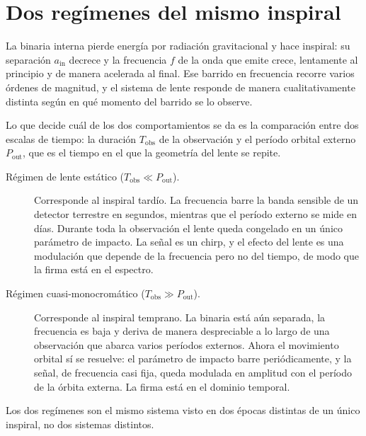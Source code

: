 \documentclass[11pt,a4paper,openany]{book}
\newcommand{\ain}{a_{\mathrm{in}}}
\begin{document}
\section{Dos reg\'imenes del mismo inspiral}
\label{sec:regimenes}

La binaria interna pierde energ\'ia por radiaci\'on gravitacional y hace
inspiral: su separaci\'on $\ain$ decrece y la frecuencia $f$ de la onda que
emite crece, lentamente al principio y de manera acelerada al final. Ese
barrido en frecuencia recorre varios \'ordenes de magnitud, y el sistema de
lente responde de manera cualitativamente distinta seg\'un en qu\'e momento
del barrido se lo observe.

Lo que decide cu\'al de los dos comportamientos se da es la comparaci\'on
entre dos escalas de tiempo: la duraci\'on $T_\mathrm{obs}$ de la
observaci\'on y el per\'iodo orbital externo $P_\mathrm{out}$, que es el
tiempo en el que la geometr\'ia del lente se repite.

\begin{description}
  \item[R\'egimen de lente est\'atico ($T_\mathrm{obs}\ll P_\mathrm{out}$).]
    Corresponde al inspiral tard\'io. La frecuencia barre la banda sensible de
    un detector terrestre en segundos, mientras que el per\'iodo externo se
    mide en d\'ias. Durante toda la observaci\'on el lente queda congelado en
    un \'unico par\'ametro de impacto. La se\~nal es un chirp, y el efecto del
    lente es una modulaci\'on que depende de la frecuencia pero no del tiempo,
    de modo que la firma est\'a en el espectro.
  \item[R\'egimen cuasi-monocrom\'atico ($T_\mathrm{obs}\gg P_\mathrm{out}$).]
    Corresponde al inspiral temprano. La binaria est\'a a\'un separada, la
    frecuencia es baja y deriva de manera despreciable a lo largo de una
    observaci\'on que abarca varios per\'iodos externos. Ahora el movimiento
    orbital s\'i se resuelve: el par\'ametro de impacto barre
    peri\'odicamente, y la se\~nal, de frecuencia casi fija, queda modulada en
    amplitud con el per\'iodo de la \'orbita externa. La firma est\'a en el
    dominio temporal.
\end{description}

Los dos reg\'imenes son el mismo sistema visto en dos \'epocas distintas de un
\'unico inspiral, no dos sistemas distintos.

\end{document}
